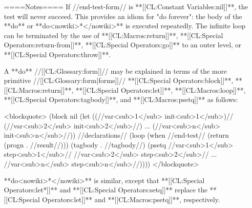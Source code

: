 ====Notes====
If //end-test-form// is **[[CL:Constant Variables:nil]]**, the test will never succeed. This provides an idiom for "do forever": the body of the **do** or **do<nowiki>*</nowiki>** is executed repeatedly. The infinite loop can be terminated by the use of **[[CL:Macros:return]]**, **[[CL:Special Operators:return-from]]**, **[[CL:Special Operators:go]]** to an outer level, or **[[CL:Special Operators:throw]]**.

A **do** //[[CL:Glossary:form]]// may be explained in terms of the more primitive //[[CL:Glossary:form|forms]]// **[[CL:Special Operators:block]]**, **[[CL:Macros:return]]**, **[[CL:Special Operators:let]]**, **[[CL:Macros:loop]]**, **[[CL:Special Operators:tagbody]]**, and **[[CL:Macros:psetq]]** as follows:

<blockquote>
(block nil 
  (let ((//var<sub>1</sub> init<sub>1</sub>)// 
        (//var<sub>2</sub> init<sub>2</sub>//) 
        ... 
        (//var<sub>n</sub> init<sub>n</sub>//)) 
    //declarations//
    (loop 
      (when //end-test// (return (progn . //result//))) 
      (tagbody . //tagbody//) 
      (psetq //var<sub>1</sub> step<sub>1</sub>//
             //var<sub>2</sub> step<sub>2</sub>//
             ...
             //var<sub>n</sub> step<sub>n</sub>//))))
</blockquote>

**do<nowiki>*</nowiki>** is similar, except that **[[CL:Special Operators:let*]]** and **[[CL:Special Operators:setq]]** replace the **[[CL:Special Operators:let]]** and **[[CL:Macros:psetq]]**, respectively.

 
